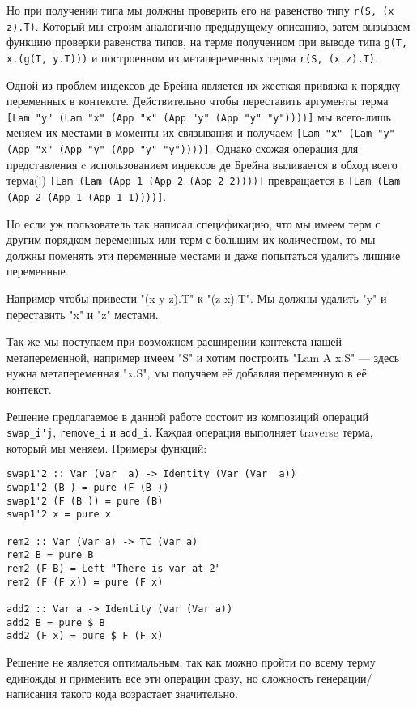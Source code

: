 Но при получении типа мы должны проверить его на равенство типу  \lstinline{r(S, (x z).T)}. Который мы строим аналогично предыдущему описанию, затем вызываем функцию проверки равенства типов, на терме полученном при выводе типа \lstinline{g(T, x.(g(T, y.T)))} и построенном из метапеременных терма \lstinline{r(S, (x z).T)}.


\hfill

Одной из проблем индексов де Брейна является их жесткая привязка к порядку переменных в контексте. Действительно чтобы переставить аргументы терма \lstinline{[Lam "y" (Lam "x" (App "x" (App "y" (App "y" "y"))))]} мы всего-лишь меняем их местами в моменты их связывания и получаем \lstinline{[Lam "x" (Lam "y" (App "x" (App "y" (App "y" "y"))))]}. Однако схожая операция для представления c использованием индексов де Брейна выливается в обход всего терма(!) \lstinline{[Lam (Lam (App 1 (App 2 (App 2 2))))]} превращается в \lstinline{[Lam (Lam (App 2 (App 1 (App 1 1))))]}.

Но если уж пользователь так написал спецификацию, что мы имеем терм с другим порядком переменных или терм с большим их количеством, то мы должны поменять эти переменные местами и даже попытаться удалить лишние переменные.

Например чтобы привести "(x y z).T" к "(z x).T". Мы должны удалить "y" и переставить "x" и "z" местами.

Так же мы поступаем при возможном расширении контекста нашей метапеременной, например имеем "S" и хотим построить "Lam A x.S" --- здесь нужна метапеременная "x.S", мы получаем её добавляя переменную в её контекст.

Решение предлагаемое в данной работе состоит из композиций операций \lstinline{swap_i'j}, \lstinline{remove_i} и \lstinline{add_i}. Каждая операция выполняет traverse терма, который мы меняем. Примеры функций:
\begin{lstlisting}[frame=single]
swap1'2 :: Var (Var  a) -> Identity (Var (Var  a))
swap1'2 (B ) = pure (F (B ))
swap1'2 (F (B )) = pure (B)
swap1'2 x = pure x

rem2 :: Var (Var a) -> TC (Var a)
rem2 B = pure B
rem2 (F B) = Left "There is var at 2"
rem2 (F (F x)) = pure (F x)

add2 :: Var a -> Identity (Var (Var a))
add2 B = pure $ B
add2 (F x) = pure $ F (F x)
\end{lstlisting}

Решение не является оптимальным, так как можно пройти по всему терму единожды и применить все эти операции сразу, но сложность генерации/написания такого кода возрастает значительно.


